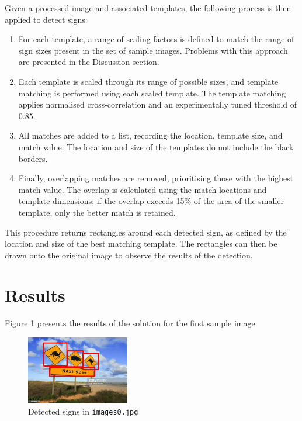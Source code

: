 Given a processed image and associated templates, the following process is then applied to detect signs:
\begin{enumerate}
  \item For each template, a range of scaling factors is defined to match the range of sign sizes present in the set of sample images. Problems with this approach are presented in the Discussion section.

  \item Each template is scaled through its range of possible sizes, and template matching is performed using each scaled template. The template matching applies normalised cross-correlation and an experimentally tuned threshold of 0.85.

  \item All matches are added to a list, recording the location, template size, and match value. The location and size of the templates do not include the black borders.

  \item Finally, overlapping matches are removed, prioritising those with the highest match value. The overlap is calculated using the match locations and template dimensions; if the overlap exceeds 15\% of the area of the smaller template, only the better match is retained.

\end{enumerate}

This procedure returns rectangles around each detected sign, as defined by the location and size of the best matching template. The rectangles can then be drawn onto the original image to observe the results of the detection.

\section{Results}

Figure \ref{fig:q1aresults} presents the results of the solution for the first sample image.

\begin{figure}[ht]
  \centering
  \includegraphics[width=0.4\textwidth]{images/q1_results_a.png}
  \caption{Detected signs in \texttt{images0.jpg}}
  \label{fig:q1aresults}
\end{figure}

